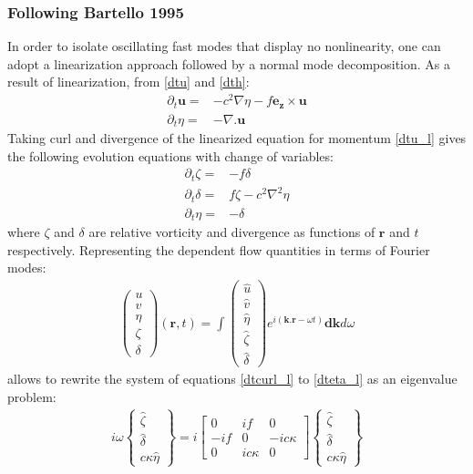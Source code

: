\subsubsection{Following Bartello 1995}
In order to isolate oscillating fast modes that display no nonlinearity, one
can adopt a linearization approach followed by a normal mode decomposition.
As a result of linearization, from \eqref{dtu} and \eqref{dth}:
\begin{align}
    \label{dtu_l}
    \partial_t \mathbf u = & - c^2 \nabla \eta - f\mathbf{e_z} \times \mathbf u \\
    \label{dth_l}
    \partial_t \eta =      & - \nabla.  \mathbf u
\end{align}
Taking curl and divergence of the linearized equation for momentum
\eqref{dtu_l} gives the following evolution equations with change of variables:
\begin{align}
    \partial_t \zeta =  & - f \delta
    \label{dtcurl_l}                                                  \\
    \partial_t \delta = & f \zeta - c^2 \nabla^2 \eta \label{dtdiv_l} \\
    \partial_t \eta =   & - \delta \label{dteta_l}
\end{align}
where $\zeta$ and $\delta$ are relative vorticity and divergence as functions
of $\mathbf{r}$ and $t$ respectively. Representing the dependent flow
quantities in terms of Fourier modes:
\begin{align}
    \begin{pmatrix}
        u \\ v \\ \eta \\ \zeta \\ \delta
    \end{pmatrix} (\mathbf{r},t)
    = \int
    \begin{pmatrix}
        \hat{u} \\ \hat{v} \\ \hat{\eta} \\ \hat{\zeta} \\ \hat{\delta}
    \end{pmatrix} e^{i(\mathbf k . \mathbf{r} - \omega t)} \mathbf{dk} d\omega
\end{align}
allows to rewrite the system of equations \eqref{dtcurl_l} to \eqref{dteta_l}
as an eigenvalue problem:
\begin{align}
    i\omega
    \begin{Bmatrix}
        \hat{\zeta} \\ \hat{\delta} \\c\kappa\hat{\eta}
    \end{Bmatrix}
    = i
    \begin{bmatrix}
        0   & if       & 0         \\
        -if & 0        & -ic\kappa \\
        0   & ic\kappa & 0
    \end{bmatrix}
    \begin{Bmatrix}
        \hat{\zeta} \\ \hat{\delta} \\c\kappa\hat{\eta}
    \end{Bmatrix}
\end{align}

